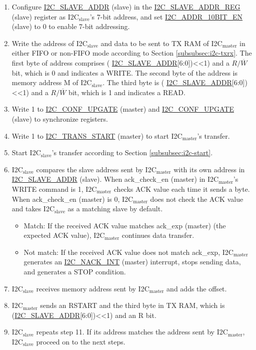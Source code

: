 \documentclass[main\_\_EN.tex]{subfiles}
\begin{document}
\begin{enumerate}
\item Configure \hyperref[fielddesc:I2CSLAVEADDR]{I2C\_SLAVE\_ADDR} (slave) in the \hyperref[regdesc:I2CSLAVEADDRREG]{I2C\_SLAVE\_ADDR\_REG} (slave) register as I2C$_\text{slave}$'s 7-bit address, and set \hyperref[fielddesc:I2CADDR10BITEN]{I2C\_ADDR\_10BIT\_EN} (slave) to 0 to enable 7-bit addressing.
\item Write the address of I2C$_\text{slave}$ and data to be sent to TX RAM of I2C$_\text{master}$ in either FIFO or non-FIFO mode according to Section \ref{subsubsec:i2c-txrx}. The first byte of address comprises ( \hyperref[fielddesc:I2CSLAVEADDR]{I2C\_SLAVE\_ADDR}[6:0])<<1) and a $R/\overline W$ bit, which is 0 and indicates a WRITE. The second byte of the address is memory address M of I2C$_\text{slave}$. The third byte is ( \hyperref[fielddesc:I2CSLAVEADDR]{I2C\_SLAVE\_ADDR}[6:0])<<1) and a $R/\overline W$ bit, which is 1 and indicates a READ.

\item Write 1 to \hyperref[fielddesc:I2CCONFUPGATE]{I2C\_CONF\_UPGATE} (master) and \hyperref[fielddesc:I2CCONFUPGATE]{I2C\_CONF\_UPGATE} (slave) to synchronize registers.
\item Write 1 to \hyperref[fielddesc:I2CTRANSSTART]{I2C\_TRANS\_START} (master) to start I2C$_\text{master}$'s transfer.
\item Start I2C$_\text{slave}$'s transfer according to Section \ref{subsubsec:i2c-start}.
\item I2C$_\text{slave}$ compares the slave address sent by I2C$_\text{master}$ with its own address in \hyperref[fielddesc:I2CSLAVEADDR]{I2C\_SLAVE\_ADDR} (slave). When ack\_check\_en (master) in I2C$_\text{master}$'s WRITE command is 1, I2C$_\text{master}$ checks ACK value each time it sends a byte. When ack\_check\_en (master) is 0, I2C$_\text{master}$ does not check the ACK value and takes I2C$_\text{slave}$ as a matching slave by default.
\begin{itemize}
\item Match: If the received ACK value matches ack\_exp (master) (the expected ACK value), I2C$_\text{master}$ continues data transfer.
\item Not match: If the received ACK value does not match ack\_exp, I2C$_\text{master}$ generates an \hyperref[int:i2c-nack]{I2C\_NACK\_INT} (master) interrupt, stops sending data, and generates a STOP condition.
\end{itemize}
\item I2C$_\text{slave}$ receives memory address sent by I2C$_\text{master}$ and adds the offset.
\item I2C$_\text{master}$ sends an RSTART and the third byte in TX RAM, which is (\hyperref[fielddesc:I2CSLAVEADDR]{I2C\_SLAVE\_ADDR}[6:0])<<1) and an R bit. 
\item I2C$_\text{slave}$ repeats step 11. If its address matches the address sent by I2C$_\text{master}$, I2C$_\text{slave}$ proceed on to the next steps.


\end{enumerate}
\end{document}
